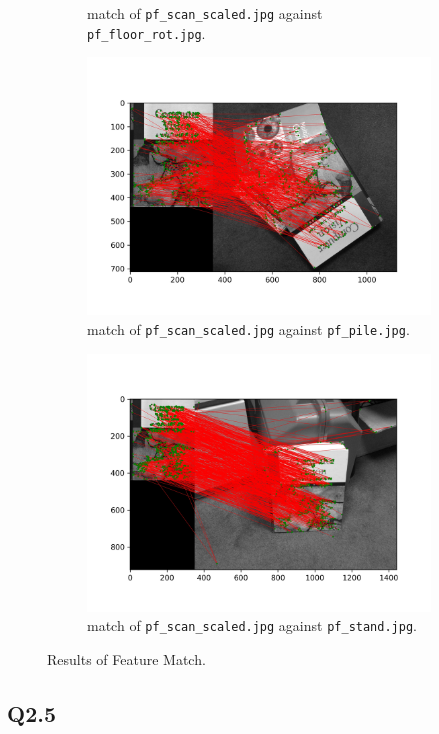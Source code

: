 \documentclass[11pt]{article}
\newcommand{\code}[1]{\texttt{#1}}
\begin{document}
\begin{figure}[h!]
\begin{subfigure}{.327\textwidth}
      \caption{match of \code{pf\_scan\_scaled.jpg} against \code{pf\_floor\_rot.jpg}.}
    \end{subfigure}
    \begin{subfigure}{.327\textwidth}
      \centering
      \includegraphics[width=.8\linewidth]{../results/pf_pile_match.jpg}
      \caption{match of \code{pf\_scan\_scaled.jpg} against \code{pf\_pile.jpg}.}
    \end{subfigure}
    \begin{subfigure}{.327\textwidth}
      \centering
      \includegraphics[width=.8\linewidth]{../results/pf_stand_match.jpg}
      \caption{match of \code{pf\_scan\_scaled.jpg} against \code{pf\_stand.jpg}.}
    \end{subfigure}
    \caption{Results of Feature Match. }
    \label{fig:q2.4}
\end{figure}

\newpage

\subsection*{Q2.5}
\end{document}
